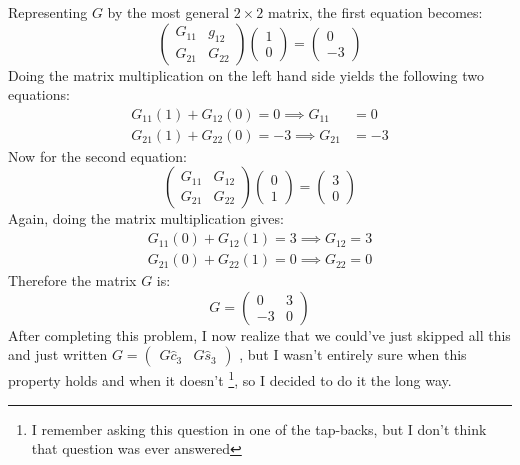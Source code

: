 \documentclass[10pt]{article}
\begin{document}
\begin{enumerate}[label=\alph*)]
\begin{solution}
				Representing $G$ by the most general $2\times 2$ matrix, the first equation becomes:
				\[
					\begin{pmatrix} G_{11} & g_{12} \\ G_{21} & G_{22} \end{pmatrix} \begin{pmatrix} 1\\0 \end{pmatrix} = \begin{pmatrix} 0 \\ -3 \end{pmatrix} 
				\] 
				Doing the matrix multiplication on the left hand side yields the following two equations:
				\begin{align*}
					G_{11}(1) + G_{12}(0) = 0 \implies G_{11} &= 0\\
					G_{21}(1) + G_{22}(0) = -3 \implies G_{21} &= -3
				\end{align*}
				Now for the second equation:
				\[
					\begin{pmatrix} G_{11} & G_{12}\\G_{21} & G_{22} \end{pmatrix} \begin{pmatrix} 0 \\ 1 \end{pmatrix} = \begin{pmatrix} 3\\ 0 \end{pmatrix} 
				\] 
				Again, doing the matrix multiplication gives:
				\begin{align*}
					G_{11}(0) + G_{12}(1) = 3 \implies G_{12} = 3\\
					G_{21}(0) + G_{22}(1) = 0 \implies G_{22} = 0
				\end{align*}
				Therefore the matrix $G$ is:
				\[
					G = \begin{pmatrix} 0 & 3 \\ -3 & 0 \end{pmatrix} 
				\] 
				After completing this problem, I now realize that we could've just skipped all this and just 
				written $G = \begin{pmatrix}  G \hat{c}_3& G \hat{s}_3 \end{pmatrix}$ , but I wasn't entirely
				sure when this property holds 
				and when it doesn't \footnote{I remember asking this question in one of the tap-backs, but 
				I don't think that question was ever answered}, so I decided to do it the long way. 
			\end{solution}
	\end{enumerate}
\end{document}

